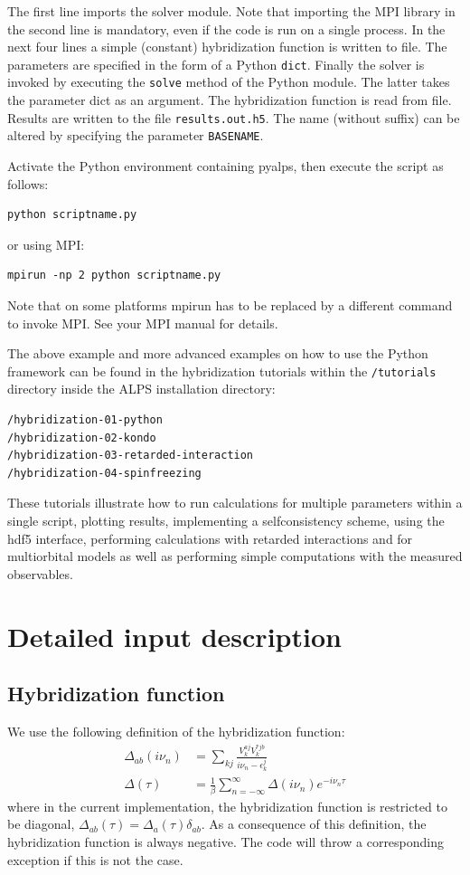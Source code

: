\documentclass[aps,prb,floatfix,superscriptaddress,twocolumn,notitlepage]{revtex4-1}
\newcommand{\iom}{{\ensuremath{i\nu}}}
\begin{document}
The first line imports the solver module. Note that importing the MPI library in the second line is mandatory, even if the code is run on a single process. In the next four lines a simple (constant) hybridization function is written to file.
The parameters are specified in the form of a Python \verb#dict#.
Finally the solver is invoked by executing the \verb#solve# method of the Python module. The latter takes the parameter dict as an argument. The hybridization function is read from file. Results are written to the file \verb#results.out.h5#. The name (without suffix) can be altered by specifying the parameter \verb#BASENAME#.

Activate the Python environment containing pyalps, then execute the script as follows:
\begin{verbatim}
python scriptname.py
\end{verbatim}
or using MPI:
\begin{verbatim}
mpirun -np 2 python scriptname.py
\end{verbatim}
Note that on some platforms mpirun has to be replaced by a different command to invoke MPI. See your MPI manual for details. 

The above example and more advanced examples on how to use the Python framework can be found in the hybridization tutorials within the \verb#/tutorials# directory inside the ALPS installation directory:
\begin{verbatim}
/hybridization-01-python
/hybridization-02-kondo
/hybridization-03-retarded-interaction
/hybridization-04-spinfreezing
\end{verbatim}

These tutorials illustrate how to run calculations for multiple parameters within a single script, plotting results, implementing a selfconsistency scheme, using the hdf5 interface, performing calculations with retarded interactions and for multiorbital models as well as performing simple computations with the measured observables.

\section{Detailed input description}

\subsection{Hybridization function}
\label{hybridization}
We use the following definition of the hybridization function:
\begin{align}
\Delta_{ab}(\iom_{n}) &= \sum_{kj}\frac{V_{k}^{aj}V_{k}^{*jb}}{\iom_{n}-\epsilon_{k}^{j}}\\
\Delta(\tau) &= \frac{1}{\beta}\sum_{n=-\infty}^{\infty}\Delta(\iom_{n})e^{-\iom_{n}\tau}
\end{align}
where in the current implementation, the hybridization function is restricted to be diagonal, $\Delta_{ab}(\tau)=\Delta_{a}(\tau)\delta_{ab}$.
As a consequence of this definition, the hybridization function is always negative. The code will throw a corresponding exception if this is not the case.
\end{document}
